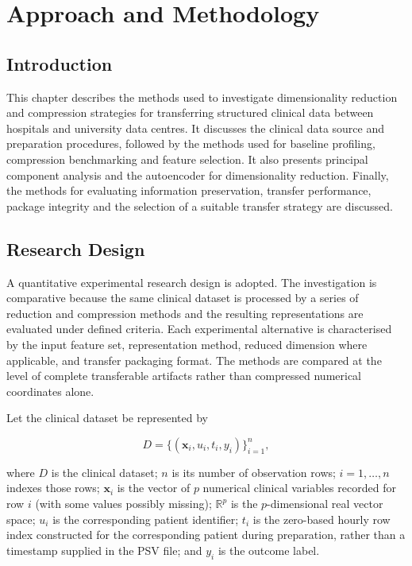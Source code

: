 \chapter{Approach and Methodology}
\label{chap:methodolgy}
\section{Introduction}
This chapter describes the methods used to investigate dimensionality
reduction and compression strategies for transferring structured
clinical data between hospitals and university data centres. It
discusses the clinical data source and preparation procedures, followed
by the methods used for baseline profiling, compression benchmarking and
feature selection. It also presents principal component analysis and the
autoencoder for dimensionality reduction. Finally, the methods for
evaluating information preservation, transfer performance, package
integrity and the selection of a suitable transfer strategy are
discussed.

\vspace{1cm}

\section{Research Design}\label{research-design}

A quantitative experimental research design is adopted. The
investigation is comparative because the same clinical dataset is
processed by a series of reduction and compression methods and the
resulting representations are evaluated under defined criteria. Each
experimental alternative is characterised by the input feature set,
representation method, reduced dimension where applicable, and transfer
packaging format. The methods are compared at the level of complete
transferable artifacts rather than compressed numerical coordinates
alone.

\noindent Let the clinical dataset be represented by

\[
D=\{(\boldsymbol{x}_i,u_i,t_i,y_i)\}_{i=1}^{n},\tag{3.2.1}
\]

where \(D\) is the clinical dataset; \(n\) is its number of observation
rows; \(i=1,\ldots,n\) indexes those rows; \(\boldsymbol{x}_i\) is the
vector of \(p\) numerical clinical variables recorded for row \(i\)
(with some values possibly missing); \(\mathbb{R}^{p}\) is the
\(p\)-dimensional real vector space; \(u_i\) is the corresponding
patient identifier; \(t_i\) is the zero-based hourly row index
constructed for the corresponding patient during preparation, rather
than a timestamp supplied in the PSV file; and \(y_i\) is the outcome
label.

